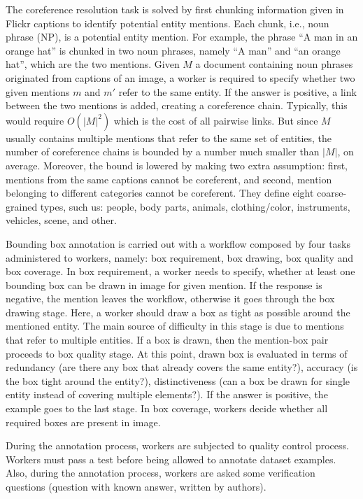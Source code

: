The coreference resolution task is solved by first chunking
information given in Flickr captions to identify potential entity
mentions. Each chunk, i.e., noun phrase (NP), is a potential entity
mention. For example, the phrase ``A man in an orange hat'' is chunked
in two noun phrases, namely ``A man'' and ``an orange hat'', which are
the two mentions. Given $M$ a document containing noun phrases
originated from captions of an image, a worker is required to specify
whether two given mentions $m$ and $m'$ refer to the same entity. If
the answer is positive, a link between the two mentions is added,
creating a coreference chain. Typically, this would require $O(|M|^2)$
which is the cost of all pairwise links. But since $M$ usually
contains multiple mentions that refer to the same set of entities, the
number of coreference chains is bounded by a number much smaller than
$|M|$, on average. Moreover, the bound is lowered by making two extra
assumption: first, mentions from the same captions cannot be
coreferent, and second, mention belonging to different categories
cannot be coreferent. They define eight coarse-grained types, such us:
people, body parts, animals, clothing/color, instruments, vehicles,
scene, and other.

Bounding box annotation is carried out with a workflow composed by
four tasks administered to workers, namely: box requirement, box
drawing, box quality and box coverage. In box requirement, a worker
needs to specify, whether at least one bounding box can be drawn in
image for given mention. If the response is negative, the mention
leaves the workflow, otherwise it goes through the box drawing stage.
Here, a worker should draw a box as tight as possible around the
mentioned entity. The main source of difficulty in this stage is due
to mentions that refer to multiple entities. If a box is drawn, then
the mention-box pair proceeds to box quality stage. At this point,
drawn box is evaluated in terms of redundancy (are there any box that
already covers the same entity?), accuracy (is the box tight around
the entity?), distinctiveness (can a box be drawn for single entity
instead of covering multiple elements?). If the answer is positive,
the example goes to the last stage. In box coverage, workers decide
whether all required boxes are present in image. 

During the annotation process, workers are subjected to quality
control process. Workers must pass a test before being allowed to
annotate dataset examples. Also, during the annotation process,
workers are asked some verification questions (question with known
answer, written by authors).

